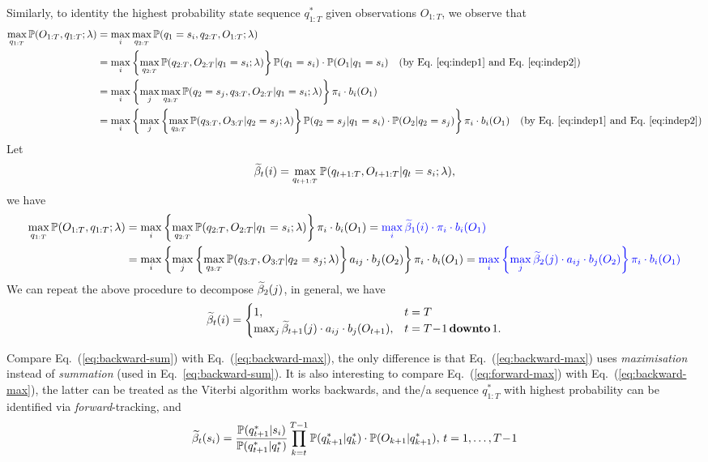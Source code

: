Similarly, to identity the highest probability state sequence $q_{1:T}^*$ given observations $O_{1:T}$, 
we observe that 
\begin{align*}
\max_{q_{1:T}} \mathbb{P}(O_{1:T}, q_{1:T} ;\lambda) 
&= \max_{i} \max_{q_{2:T}} \mathbb{P}(q_1 = s_i, q_{2:T}, O_{1:T} ;\lambda) \\
&= \max_{i} \left\{ \max_{q_{2:T}} \mathbb{P}(q_{2:T}, O_{2:T} |q_1 = s_i; \lambda) \right\} \mathbb{P}(q_1 = s_i) \cdot \mathbb{P}(O_1 |q_1 = s_i) 
   ~~~ \text{(by Eq.~\ref{eq:indep1} and Eq.~\ref{eq:indep2})} \\
&= \max_{i} \left\{ \max_{j} \max_{q_{3:T}} \mathbb{P}(q_2 = s_j, q_{3:T}, O_{2:T} |q_1 = s_i; \lambda) \right\} \pi_i \cdot b_i(O_1) \\
&= \max_{i} \left\{ \max_{j} \left\{ \max_{q_{3:T}} \mathbb{P}(q_{3:T}, O_{3:T} |q_2 = s_j; \lambda) \right\} \mathbb{P}(q_2 = s_j |q_1 = s_i) \cdot \mathbb{P}(O_2 |q_2 = s_j) 
   \right\} \pi_i \cdot b_i(O_1) 
   ~~~ \text{(by Eq.~\ref{eq:indep1} and Eq.~\ref{eq:indep2})}
\end{align*}
Let 
\begin{equation}
\label{eq:betat}
\widetilde{\beta}_t(i) = \max_{q_{t+1:T}} \mathbb{P}(q_{t+1:T}, O_{t+1:T} |q_t = s_i; \lambda),
\end{equation}
we have
\begin{alignat}{2}
\max_{q_{1:T}} \mathbb{P}(O_{1:T}, q_{1:T} ;\lambda) 
&= \max_{i} \left\{ \max_{q_{2:T}} \mathbb{P}(q_{2:T}, O_{2:T} |q_1 = s_i; \lambda) \right\} \pi_i \cdot b_i(O_1) 
 = {\color{blue}{\max_{i} \widetilde{\beta}_1(i) \cdot \pi_i \cdot b_i(O_1)}}  \label{eq:max-backward}\\
&= \max_{i} \left\{ \max_{j} \left\{ \max_{q_{3:T}} \mathbb{P}(q_{3:T}, O_{3:T} |q_2 = s_j; \lambda) \right\} a_{ij} \cdot b_j(O_2) \right\} \pi_i \cdot b_i(O_1) 
 = {\color{blue}{\max_{i} \left\{ \max_{j} \widetilde{\beta}_2(j) \cdot a_{ij} \cdot b_j(O_2) \right\} \pi_i \cdot b_i(O_1)}}  \nonumber
\end{alignat}
We can repeat the above procedure to decompose $\widetilde{\beta}_2(j)$, in general, we have
\begin{equation}
\label{eq:backward-max}
\widetilde{\beta}_t(i) = \begin{cases}
              1, & t=T \\
              \max_{j} \widetilde{\beta}_{t+1}(j) \cdot a_{ij} \cdot b_j(O_{t+1}), & t=T\!-\!1 \,\textbf{downto}\, 1.
             \end{cases}
\end{equation}

Compare Eq.~(\ref{eq:backward-sum}) with Eq.~(\ref{eq:backward-max}), 
the only difference is that Eq.~(\ref{eq:backward-max}) uses \emph{maximisation} instead of \emph{summation} (used in Eq.~\ref{eq:backward-sum}).
It is also interesting to compare Eq.~(\ref{eq:forward-max}) with Eq.~(\ref{eq:backward-max}), 
the latter can be treated as the Viterbi algorithm works backwards, 
and the/a sequence $q_{1:T}^*$ with highest probability can be identified via \emph{forward}-tracking, and
\begin{equation}
\label{eq:beta-sum}
\widetilde{\beta}_t(s_i) = \frac{\mathbb{P}(q_{t+1}^* |s_i)} {\mathbb{P}(q_{t+1}^* |q_t^*)} \prod_{k=t}^{T-1} \mathbb{P}(q_{k+1}^* |q_{k}^*) \cdot \mathbb{P}(O_{k+1} |q_{k+1}^*), \, t = 1,\dots,T\!-\!1
\end{equation}

